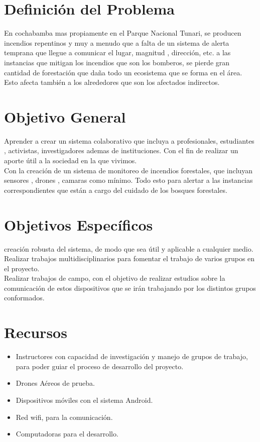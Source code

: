 \documentclass[letter,12pt]{article}
\begin{document}
\section{Definici\'on del Problema}
En cochabamba mas propiamente en el Parque Nacional Tunari, se producen incendios repentinos y muy a menudo que a falta de un sistema de alerta temprana que llegue a comunicar el lugar, magnitud , dirección, etc. a las instancias que mitigan los incendios que son los bomberos, se pierde gran cantidad de forestación que daña todo un ecosistema que se forma en el área. Esto afecta también a los alrededores que son los afectados indirectos.\\
\section{Objetivo General}
Aprender a crear un sistema colaborativo que incluya a profesionales, estudiantes , activistas, investigadores ademas de instituciones. Con el fin de realizar un aporte útil a la sociedad en la que vivimos.\\
Con la creación de un sistema de monitoreo de incendios forestales, que incluyan sensores , drones , camaras como mínimo. Todo esto para alertar a las instancias correspondientes que están a cargo del cuidado de los bosques forestales.
\section{Objetivos Espec\'ificos}
creación robusta del sistema, de modo que sea útil y aplicable a cualquier medio.\\
Realizar trabajos multidisciplinarios para fomentar el trabajo de varios grupos en el proyecto.\\
Realizar trabajos de campo, con el objetivo de realizar estudios sobre la comunicación de estos dispositivos que se irán trabajando por los distintos grupos conformados.
\section{Recursos}
\begin{itemize}
\item Instructores con capacidad de investigación y manejo de grupos de trabajo, para poder guiar el proceso de desarrollo del proyecto.
\item Drones Aéreos de prueba.
\item Dispositivos móviles con el sistema Android.
\item Red wifi, para la comunicación.
\item Computadoras para el desarrollo.
\end{itemize}
\end{document}
